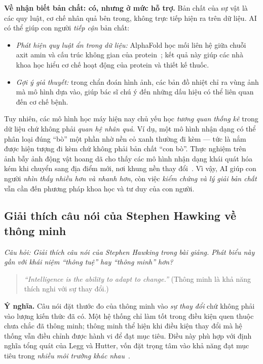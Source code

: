 \textbf{Về nhận biết bản chất: có, nhưng ở mức hỗ trợ.} Bản chất của sự vật là các quy luật, cơ chế nhân quả bên trong, không trực tiếp hiện ra trên dữ liệu. AI có thể giúp con người \emph{tiếp cận} bản chất:
\begin{itemize}
    \item \emph{Phát hiện quy luật ẩn trong dữ liệu:} AlphaFold học mối liên hệ giữa chuỗi axit amin và cấu trúc không gian của protein~\citep{week2_alphafold2021}; kết quả này giúp các nhà khoa học hiểu cơ chế hoạt động của protein và thiết kế thuốc.
    \item \emph{Gợi ý giả thuyết:} trong chẩn đoán hình ảnh, các bản đồ nhiệt chỉ ra vùng ảnh mà mô hình dựa vào, giúp bác sĩ chú ý đến những dấu hiệu có thể liên quan đến cơ chế bệnh.
\end{itemize}
Tuy nhiên, các mô hình học máy hiện nay chủ yếu học \emph{tương quan thống kê} trong dữ liệu chứ không phải \emph{quan hệ nhân quả}. Ví dụ, một mô hình nhận dạng có thể phân loại đúng ``bò'' một phần nhờ nền cỏ xanh thường đi kèm — tức là nắm được hiện tượng đi kèm chứ không phải bản chất ``con bò''. Thực nghiệm trên ảnh bẫy ảnh động vật hoang dã cho thấy các mô hình nhận dạng khái quát hóa kém khi chuyển sang địa điểm mới, nơi khung nền thay đổi~\citep{beery2018recognition}. Vì vậy, AI giúp con người \emph{nhìn thấy nhiều hơn và nhanh hơn}, còn việc \emph{kiểm chứng và lý giải bản chất} vẫn cần đến phương pháp khoa học và tư duy của con người.

\subsection{Giải thích câu nói của Stephen Hawking về thông minh}
\label{subsec:w2_hawking}

\textit{Câu hỏi: Giải thích câu nói của Stephen Hawking trong bài giảng. Phát biểu này gần với khái niệm ``thông tuệ'' hay ``thông minh'' hơn?}

\begin{quote}
\textit{``Intelligence is the ability to adapt to change.''} (Thông minh là khả năng thích nghi với sự thay đổi.)~\citep{xlav_ai4cv}
\end{quote}

\textbf{Ý nghĩa.} Câu nói đặt thước đo của thông minh vào \emph{sự thay đổi} chứ không phải vào lượng kiến thức đã có. Một hệ thống chỉ làm tốt trong điều kiện quen thuộc chưa chắc đã thông minh; thông minh thể hiện khi điều kiện thay đổi mà hệ thống vẫn điều chỉnh được hành vi để đạt mục tiêu. Điều này phù hợp với định nghĩa tổng quát của Legg và Hutter, vốn đặt trọng tâm vào khả năng đạt mục tiêu trong \emph{nhiều môi trường khác nhau}~\citep{legg2007collection}.

